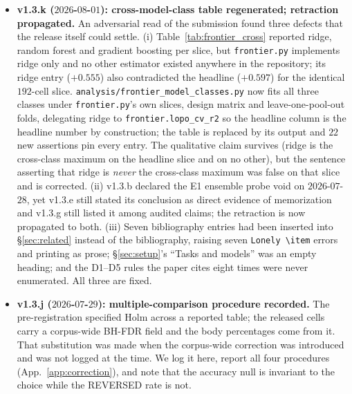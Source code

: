 \documentclass[11pt]{article}
\begin{document}
\begin{itemize}[leftmargin=*]
\item \textbf{v1.3.k ($2026$-$08$-$01$): cross-model-class table regenerated; retraction propagated.} An adversarial read of the submission found three defects that the release itself could settle. (i) Table~\ref{tab:frontier_cross} reported ridge, random forest and gradient boosting per slice, but \texttt{frontier.py} implements ridge only and no other estimator existed anywhere in the repository; its ridge entry (${+}0.555$) also contradicted the headline (${+}0.597$) for the identical $192$-cell slice. \texttt{analysis/\allowbreak frontier\_\allowbreak model\_\allowbreak classes.\allowbreak py} now fits all three classes under \texttt{frontier.py}'s own slices, design matrix and leave-one-pool-out folds, delegating ridge to \texttt{frontier.\allowbreak lopo\_\allowbreak cv\_\allowbreak r2} so the headline column is the headline number by construction; the table is replaced by its output and $22$ new assertions pin every entry. The qualitative claim survives (ridge is the cross-class maximum on the headline slice and on no other), but the sentence asserting that ridge is \emph{never} the cross-class maximum was false on that slice and is corrected. (ii) v1.3.b declared the E1 ensemble probe void on $2026$-$07$-$28$, yet v1.3.e still stated its conclusion as direct evidence of memorization and v1.3.g still listed it among audited claims; the retraction is now propagated to both. (iii) Seven bibliography entries had been inserted into \S\ref{sec:related} instead of the bibliography, raising seven \texttt{Lonely \textbackslash item} errors and printing as prose; \S\ref{sec:setup}'s ``Tasks and models'' was an empty heading; and the D1--D5 rules the paper cites eight times were never enumerated. All three are fixed.
\item \textbf{v1.3.j ($2026$-$07$-$29$): multiple-comparison procedure recorded.} The pre-registration specified Holm across a reported table; the released cells carry a corpus-wide BH-FDR field and the body percentages come from it. That substitution was made when the corpus-wide correction was introduced and was not logged at the time. We log it here, report all four procedures (App.~\ref{app:correction}), and note that the accuracy null is invariant to the choice while the REVERSED rate is not.

\end{itemize}
\end{document}

